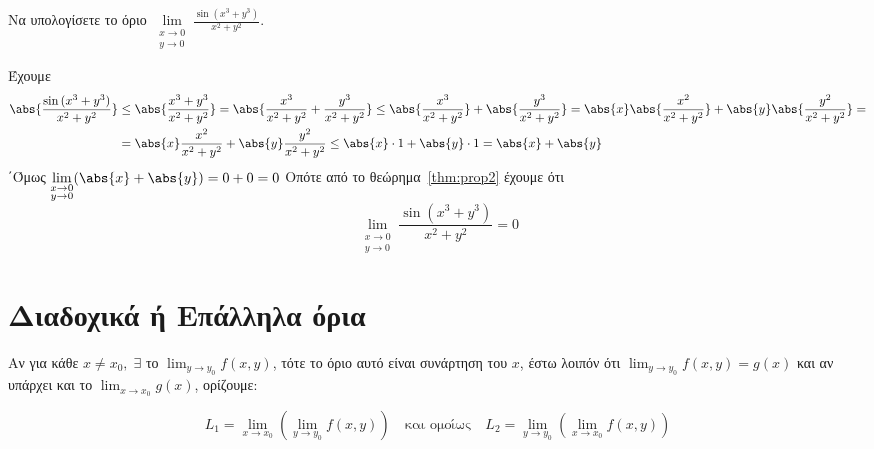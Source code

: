 \documentclass[a4paper,11pt]{report}
\begin{document}
  \begin{example}
    Να υπολογίσετε το όριο $ \lim\limits_{\substack{x\to 0 \\y \to 0}}
    \frac{\sin{(x^{3}+y^{3})}}{x^{2}+y^{2}} $.
    \begin{solution}
      Έχουμε 
      \begin{align*}
        \abs{\frac{\sin{(x^{3}+y^3)}}{x^{2}+y^{2}}} 
      &\leq \abs{\frac{x^{3}+y^{3}}{x^{2}+y^{2}}} = \abs{\frac{x^{3}}{x^{2}+y^2} +
      \frac{y^{3}}{x^{2}+y^{2}}} \leq \abs{\frac{x^{3}}{x^{2}+y^{2}}} +
      \abs{\frac{y^{3}}{x^{2}+y^{2}}}  
      = \abs{x} \abs{\frac{x^{2}}{x^{2}+y^{2}}} +
      \abs{y} \abs{\frac{y^{2}}{x^{2}+y^{2}}} = \\ 
      &= \abs{x} \frac{x^{2}}{x^{2}+y^{2}} + \abs{y} \frac{y^{2}}{x^{2}+y^{2}} 
      \leq \abs{x}\cdot 1 + \abs{y} \cdot 1 = \abs{x} + \abs{y}
      \end{align*} 
      ΄Όμως $ \lim\limits_{\substack{x\to 0 \\y \to 0}} (\abs{x} + \abs{y} ) = 0 + 0 = 0$ 
      Οπότε από το θεώρημα~\ref{thm:prop2} έχουμε ότι 
      \[
        \lim\limits_{\substack{x\to 0 \\y \to 0}} \frac{\sin{(x^{3}+y^{3})}}{x^{2}+y^{2}} =
        0 
      \] 
    \end{solution}
  \end{example}

  \section{Διαδοχικά ή Επάλληλα όρια}

  \begin{mybox1}
    \begin{dfn}
      Αν για κάθε $ x \neq x_{0}, \; \exists $ το $ \lim_{y \to y_{0}} f(x,y) $, τότε το 
      όριο αυτό είναι συνάρτηση του $x$, έστω λοιπόν ότι 
      $ \lim_{y \to y_{0}} f(x,y) = g(x) $ και αν υπάρχει και το 
      $ \lim_{x \to x_{0}} g(x) $, ορίζουμε: 

      \[
        L_{1} = \lim_{x \to x_{0}} \left(\lim_{y \to y_{0}} f(x,y)\right) 
        \quad \text{και ομοίως} \quad
        L_{2} = \lim_{y \to y_{0}} \left(\lim_{x \to x_{0}} f(x,y)\right) 
      \] 
    \end{dfn}
  \end{mybox1}
\end{document}
